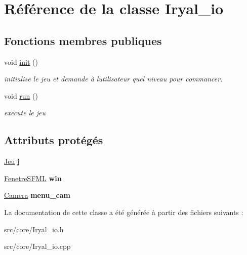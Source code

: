 \hypertarget{class_iryal__io}{}\section{Référence de la classe Iryal\+\_\+io}
\label{class_iryal__io}
\subsection*{Fonctions membres publiques}
\begin{DoxyCompactItemize}
\item 
\mbox{\label{class_iryal__io_ad0f326567efb56550ccfa7b1e37f34ec}} 
void \mbox{\hyperlink{class_iryal__io_ad0f326567efb56550ccfa7b1e37f34ec}{init}} ()
\begin{DoxyCompactList}\small\item\em initialise le jeu et demande à l\textquotesingle{}utilisateur quel niveau pour commancer. \end{DoxyCompactList}\item 
\mbox{\label{class_iryal__io_a516eaf08c26b2dbfb70a1699f9cd7665}} 
void \mbox{\hyperlink{class_iryal__io_a516eaf08c26b2dbfb70a1699f9cd7665}{run}} ()
\begin{DoxyCompactList}\small\item\em execute le jeu \end{DoxyCompactList}\end{DoxyCompactItemize}
\subsection*{Attributs protégés}
\begin{DoxyCompactItemize}
\item 
\mbox{\label{class_iryal__io_a99fc66747094872b453ba6d1782937c5}} 
\mbox{\hyperlink{class_jeu}{Jeu}} {\bfseries j}
\item 
\mbox{\label{class_iryal__io_a48ffd01f0a9ed40b0d5a4c5571791515}} 
\mbox{\hyperlink{class_fenetre_s_f_m_l}{Fenetre\+S\+F\+ML}} {\bfseries win}
\item 
\mbox{\label{class_iryal__io_a26962caff5d293de809ae6b73ae1d55d}} 
\mbox{\hyperlink{class_camera}{Camera}} {\bfseries menu\+\_\+cam}
\end{DoxyCompactItemize}


La documentation de cette classe a été générée à partir des fichiers suivants \+:\begin{DoxyCompactItemize}
\item 
src/core/Iryal\+\_\+io.\+h\item 
src/core/Iryal\+\_\+io.\+cpp\end{DoxyCompactItemize}
